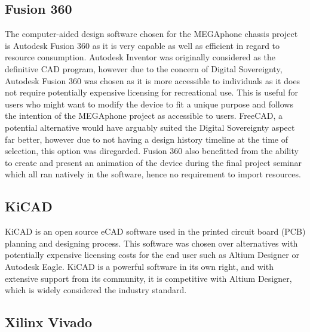 
\subsection{Fusion 360}

The computer-aided design software chosen for the MEGAphone chassis project is Autodesk Fusion 360 as it is very capable as well as efficient in regard to resource consumption. 
Autodesk Inventor was originally considered as the definitive CAD program, however due to the concern of Digital Sovereignty, Autodesk Fusion 360 was chosen as it is more accessible to individuals as it does not require potentially expensive licensing for recreational use. 
This is useful for users who might want to modify the device to fit a unique purpose and follows the intention of the MEGAphone project as accessible to users.
FreeCAD, a potential alternative would have arguably suited the Digital Sovereignty aspect far better, however due to not having a design history timeline at the time of selection, this option was diregarded.
Fusion 360 also benefitted from the ability to create and present an animation of the device during the final project seminar which all ran natively in the software, hence no requirement to import resources.


\subsection{KiCAD}

KiCAD is an open source eCAD software used in the printed circuit board (PCB) planning and designing process.
This software was chosen over alternatives with potentially expensive licensing costs for the end user such as Altium Designer or Autodesk Eagle.
KiCAD is a powerful software in its own right, and with extensive support from its community, it is competitive with Altium Designer, which is widely considered the industry standard.


\subsection{Xilinx Vivado}

